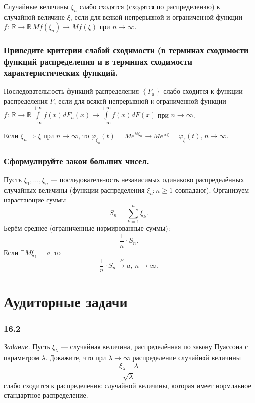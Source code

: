 Случайные величины $ \xi_n$ слабо сходятся (сходятся по распределению) к случайной величине $ \xi $,
если для всякой непрерывной и ограниченной функции
$f: \,
\mathbb{R} \rightarrow \mathbb{R} \,
Mf \left( \xi_n \right) \rightarrow Mf \left( \xi \right) $ при $n \rightarrow \infty $.

\subsubsection*{Приведите критерии слабой сходимости
(в терминах сходимости функций распределения и в терминах сходимости характеристических функций.}

Последовательность функций распределения $ \left\{ F_n \right\} $
слабо сходится к функции распределения $F$,
если для всякой непрерывной и ограниченной функции
$f: \, \mathbb{R} \rightarrow \mathbb{R} \,
\int \limits_{- \infty }^{+ \infty } f \left( x \right) dF_n \left( x \right) \rightarrow
\int \limits_{- \infty }^{+ \infty } f \left( x \right) dF \left( x \right) $
при $n \rightarrow \infty $.

Если $ \xi_n \Rightarrow \xi $ при $n \rightarrow \infty $,
то
$ \varphi_{ \xi_n} \left( t \right) =
Me^{it \xi_n} \rightarrow Me^{it \xi } =
\varphi_{ \xi } \left( t \right), \,
n \rightarrow \infty $.

\subsubsection*{Сформулируйте закон больших чисел.}

Пусть $ \xi_1, \dotsc, \xi_n$ ---
последовательность независимых одинаково распределённых случайных величины
(функции распределения $ \xi_n: n \geq 1$ совпадают).
Организуем нарастающие суммы
$$S_n =
\sum \limits_{k = 1}^n \xi_k.$$
Берём среднее (ограниченные нормированные суммы):
$$ \frac{1}{n} \cdot S_n.$$
Если $ \exists M \xi_1 = a$, то
$$ \frac{1}{n} \cdot S_n \overset{P}{ \rightarrow } a, \,
n \rightarrow \infty.$$

\section*{Аудиторные задачи}

\subsubsection*{16.2}

\textit{Задание.} Пусть $ \xi_{ \lambda }$ --- случайная величина,
распределённая по закону Пуассона с параметром $ \lambda $.
Докажите, что при $ \lambda \rightarrow \infty $ распределение случайной величины
$$ \frac{ \xi_{ \lambda } - \lambda }{ \sqrt{ \lambda }}$$
слабо сходится к распределению случайной величины,
которая имеет нормлаьное стандартное распределение.

